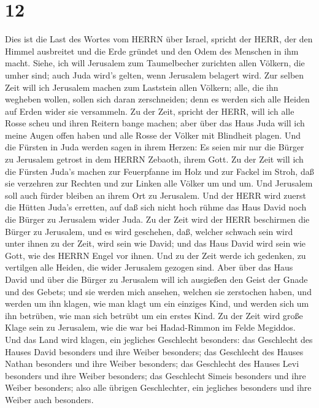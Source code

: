 \hypertarget{section-11}{%
\section{12}\label{section-11}}

 Dies ist die Last des Wortes vom HERRN über Israel, spricht
der HERR, der den Himmel ausbreitet und die Erde gründet und den Odem
des Menschen in ihm macht.  Siehe, ich will Jerusalem zum
Taumelbecher zurichten allen Völkern, die umher sind; auch Juda wird's
gelten, wenn Jerusalem belagert wird.  Zur selben Zeit will
ich Jerusalem machen zum Laststein allen Völkern; alle, die ihn wegheben
wollen, sollen sich daran zerschneiden; denn es werden sich alle Heiden
auf Erden wider sie versammeln.  Zu der Zeit, spricht der
HERR, will ich alle Rosse scheu und ihren Reitern bange machen; aber
über das Haus Juda will ich meine Augen offen haben und alle Rosse der
Völker mit Blindheit plagen.  Und die Fürsten in Juda werden
sagen in ihrem Herzen: Es seien mir nur die Bürger zu Jerusalem getrost
in dem HERRN Zebaoth, ihrem Gott.  Zu der Zeit will ich die
Fürsten Juda's machen zur Feuerpfanne im Holz und zur Fackel im Stroh,
daß sie verzehren zur Rechten und zur Linken alle Völker um und um. Und
Jerusalem soll auch fürder bleiben an ihrem Ort zu Jerusalem.
 Und der HERR wird zuerst die Hütten Juda's erretten, auf
daß sich nicht hoch rühme das Haus David noch die Bürger zu Jerusalem
wider Juda.  Zu der Zeit wird der HERR beschirmen die Bürger
zu Jerusalem, und es wird geschehen, daß, welcher schwach sein wird
unter ihnen zu der Zeit, wird sein wie David; und das Haus David wird
sein wie Gott, wie des HERRN Engel vor ihnen.  Und zu der
Zeit werde ich gedenken, zu vertilgen alle Heiden, die wider Jerusalem
gezogen sind.  Aber über das Haus David und über die Bürger
zu Jerusalem will ich ausgießen den Geist der Gnade und des Gebets; und
sie werden mich ansehen, welchen sie zerstochen haben, und werden um ihn
klagen, wie man klagt um ein einziges Kind, und werden sich um ihn
betrüben, wie man sich betrübt um ein erstes Kind.  Zu der
Zeit wird große Klage sein zu Jerusalem, wie die war bei Hadad-Rimmon im
Felde Megiddos.  Und das Land wird klagen, ein jegliches
Geschlecht besonders: das Geschlecht des Hauses David besonders und ihre
Weiber besonders; das Geschlecht des Hauses Nathan besonders und ihre
Weiber besonders;  das Geschlecht des Hauses Levi besonders
und ihre Weiber besonders; das Geschlecht Simeis besonders und ihre
Weiber besonders;  also alle übrigen Geschlechter, ein
jegliches besonders und ihre Weiber auch besonders.

